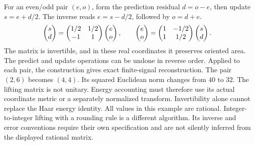 For an even/odd pair $(e,o)$, form the prediction residual $d=o-e$, then update $s=e+d/2$. The inverse reads $e=s-d/2$, followed by $o=d+e$.
\[
\begin{pmatrix}s\\d\end{pmatrix}=\begin{pmatrix}1/2&1/2\\-1&1\end{pmatrix}\begin{pmatrix}e\\o\end{pmatrix},
\qquad
\begin{pmatrix}e\\o\end{pmatrix}=\begin{pmatrix}1&-1/2\\1&1/2\end{pmatrix}\begin{pmatrix}s\\d\end{pmatrix}.
\]
The matrix is invertible, and in these real coordinates it preserves oriented area. The predict and update operations can be undone in reverse order. Applied to each pair, the construction gives exact finite-signal reconstruction.
The pair $(2,6)$ becomes $(4,4)$. Its squared Euclidean norm changes from $40$ to $32$. The lifting matrix is not unitary. Energy accounting must therefore use its actual coordinate metric or a separately normalized transform. Invertibility alone cannot replace the Haar energy identity.
All values in this example are rational. Integer-to-integer lifting with a rounding rule is a different algorithm. Its inverse and error conventions require their own specification and are not silently inferred from the displayed rational matrix.

